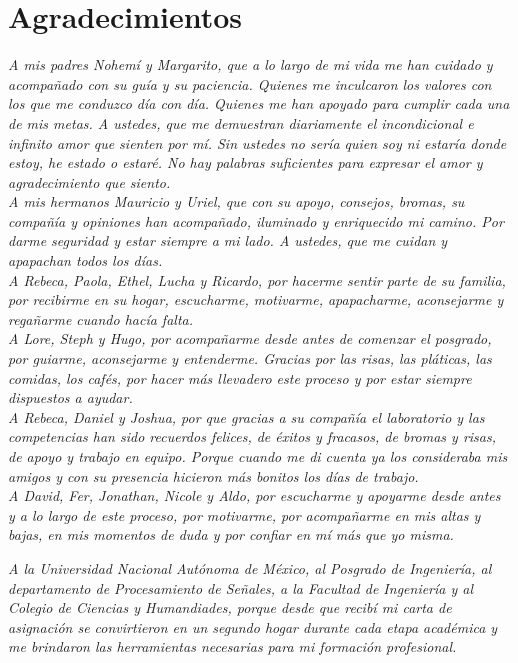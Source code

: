 \chapter*{Agradecimientos}

\textit{A mis padres Nohemí y Margarito, que a lo largo de mi vida me han cuidado y acompañado con su guía y su paciencia. Quienes me inculcaron los valores con los que me conduzco día con día. Quienes me han apoyado para cumplir cada una de mis metas. A ustedes, que me demuestran diariamente el incondicional e infinito amor que sienten por mí. Sin ustedes no sería quien soy ni estaría donde estoy, he estado o estaré. No hay palabras suficientes para expresar el amor y agradecimiento que siento.}\\

\textit{A mis hermanos Mauricio y Uriel, que con su apoyo, consejos, bromas, su compañía y opiniones han acompañado, iluminado y enriquecido mi camino. Por darme seguridad y estar siempre a mi lado. A ustedes, que me cuidan y apapachan todos los días.}\\

\textit{A Rebeca, Paola, Ethel, Lucha y Ricardo, por hacerme sentir parte de su familia, por recibirme en su hogar, escucharme, motivarme, apapacharme, aconsejarme y regañarme cuando hacía falta.}\\

\textit{A Lore, Steph y Hugo, por acompañarme desde antes de comenzar el posgrado, por guiarme, aconsejarme y entenderme. Gracias por las risas, las pláticas, las comidas, los cafés, por hacer más llevadero este proceso y por estar siempre dispuestos a ayudar.}\\

\textit{A Rebeca, Daniel y Joshua, por que gracias a su compañía el laboratorio y las competencias han sido recuerdos felices, de éxitos y fracasos, de bromas y risas, de apoyo y trabajo en equipo. Porque cuando me di cuenta ya los consideraba mis amigos y con su presencia hicieron más bonitos los días de trabajo.}\\

\textit{A David, Fer, Jonathan, Nicole y Aldo, por escucharme y apoyarme desde antes y a lo largo de este proceso, por motivarme, por acompañarme en mis altas y bajas, en mis momentos de duda y por confiar en mí más que yo misma.}\\


\newpage

\textit{A la Universidad Nacional Autónoma de México, al Posgrado de Ingeniería, al departamento de Procesamiento de Señales, a la Facultad de Ingeniería y al Colegio de Ciencias y Humandiades, porque desde que recibí mi carta de asignación se convirtieron en un segundo hogar durante cada etapa académica y me brindaron las herramientas necesarias para mi formación profesional.}\\

